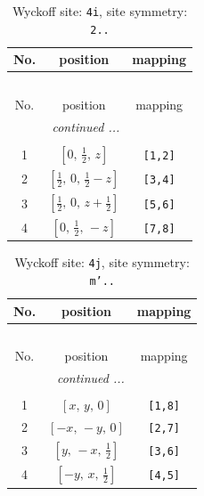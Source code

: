 \documentclass[fleqn,8pt]{jsarticle}
\begin{document}
\renewcommand{\arraystretch}{1.2}
\begin{longtable}{ccc}
\caption{Wyckoff site: {\tt 4i}, site symmetry: {\tt 2..}}
 \\
 \hline \hline
No. & position & mapping \\ \hline \endfirsthead

\multicolumn{2}{l}{\tablename\ \thetable{}} \\
 \hline \hline
No. & position & mapping \\ \hline \endhead

 \hline \hline
\multicolumn{2}{r}{\footnotesize\it continued ...} \\ \endfoot

 \hline \hline
\multicolumn{2}{r}{} \\ \endlastfoot

1 & $\left[ 0,\, \frac{1}{2},\, z \right]$ & {\tt [1,2]} \\ \hline
2 & $\left[ \frac{1}{2},\, 0,\, \frac{1}{2} - z \right]$ & {\tt [3,4]} \\ \hline
3 & $\left[ \frac{1}{2},\, 0,\, z + \frac{1}{2} \right]$ & {\tt [5,6]} \\ \hline
4 & $\left[ 0,\, \frac{1}{2},\, - z \right]$ & {\tt [7,8]} \\
\end{longtable}
\renewcommand{\arraystretch}{1.2}
\begin{longtable}{ccc}
\caption{Wyckoff site: {\tt 4j}, site symmetry: {\tt m'..}}
 \\
 \hline \hline
No. & position & mapping \\ \hline \endfirsthead

\multicolumn{2}{l}{\tablename\ \thetable{}} \\
 \hline \hline
No. & position & mapping \\ \hline \endhead

 \hline \hline
\multicolumn{2}{r}{\footnotesize\it continued ...} \\ \endfoot

 \hline \hline
\multicolumn{2}{r}{} \\ \endlastfoot

1 & $\left[ x,\, y,\, 0 \right]$ & {\tt [1,8]} \\ \hline
2 & $\left[ - x,\, - y,\, 0 \right]$ & {\tt [2,7]} \\ \hline
3 & $\left[ y,\, - x,\, \frac{1}{2} \right]$ & {\tt [3,6]} \\ \hline
4 & $\left[ - y,\, x,\, \frac{1}{2} \right]$ & {\tt [4,5]} \\
\end{longtable}
\end{document}
